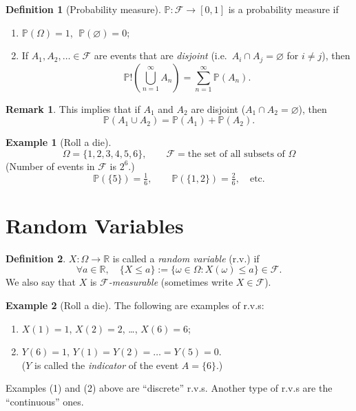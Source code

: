 \documentclass[11pt]{article}
\let\emptyset\varnothing
\newcommand{\Prob}{\mathbb{P}}
\theoremstyle{definition}
\newtheorem{definition}{Definition}[section]
\newtheorem{example}{Example}[section]
\newtheorem{remark}{Remark}[section]
\begin{document}
\begin{definition}[Probability measure]
$\Prob : \mathcal{F} \to [0,1]$ is a probability measure if
\begin{enumerate}
  \item[(i)] $\Prob(\Omega) = 1$, $\;\Prob(\emptyset) = 0$;
  \item[(ii)] If $A_1, A_2, \dots \in \mathcal{F}$ are events that are
        \emph{disjoint} (i.e.\ $A_i \cap A_j = \emptyset$ for $i \neq j$),
        then
        \[
          \Prob!\left(\bigcup_{n=1}^{\infty} A_n\right)
          = \sum_{n=1}^{\infty} \Prob(A_n).
        \]
\end{enumerate}
\end{definition}

\begin{remark}
This implies that if $A_1$ and $A_2$ are disjoint ($A_1 \cap A_2 = \emptyset$),
then
\[
  \Prob(A_1 \cup A_2) = \Prob(A_1) + \Prob(A_2).
\]
\end{remark}

\begin{example}[Roll a die]
\[
  \Omega = \{1,2,3,4,5,6\}, \qquad
  \mathcal{F} = \text{the set of all subsets of } \Omega
\]
(Number of events in $\mathcal{F}$ is $2^{6}$.)
\[
  \Prob(\{5\}) = \tfrac{1}{6}, \qquad \Prob(\{1,2\}) = \tfrac{2}{6}, \quad \text{etc.}
\]
\end{example}

\section{Random Variables}

\begin{definition}
$X : \Omega \to \mathbb{R}$ is called a \emph{random variable} (r.v.) if
\[
  \forall a \in \mathbb{R}, \quad
  \{X \le a\} := \{\omega \in \Omega : X(\omega) \le a\} \in \mathcal{F}.
\]
We also say that $X$ is \emph{$\mathcal{F}$-measurable} (sometimes write
$X \in \mathcal{F}$).
\end{definition}

\begin{example}[Roll a die]
The following are examples of r.v.s:
\begin{enumerate}
  \item $X(1) = 1$, $X(2) = 2$, \dots, $X(6) = 6$;
  \item $Y(6) = 1$, $Y(1) = Y(2) = \dots = Y(5) = 0$.\\
        ($Y$ is called the \emph{indicator} of the event $A = \{6\}$.)
\end{enumerate}
Examples (1) and (2) above are ``discrete'' r.v.s. Another type of r.v.s
are the ``continuous'' ones.
\end{example}
\end{document}
